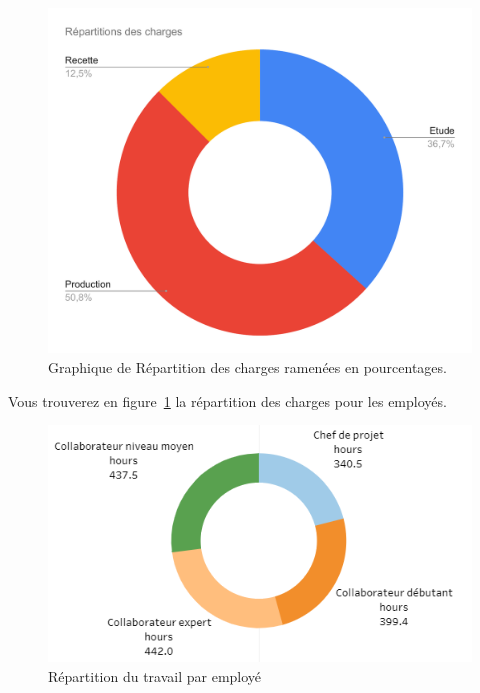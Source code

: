 \documentclass[a4paper]{article}
\begin{document}
\begin{figure}
    \centering
    \includegraphics[width=0.8 \textwidth]{Images/repartition_charges.pdf}
    \caption{Graphique de Répartition des charges ramenées en pourcentages.}
\end{figure}

Vous trouverez en figure~\ref{fig:charges_employes} la répartition des charges pour les employés.

\begin{figure}[h]
    \centering
    \includegraphics[width=12cm]{Images/charges_employes.png}
    \caption{Répartition du travail par employé}
    \label{fig:charges_employes}
\end{figure}
\end{document}
